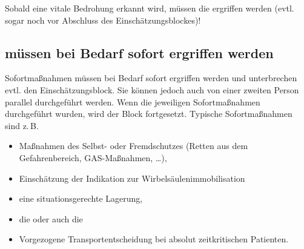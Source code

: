 \begin{Danger}
  \item Sobald eine vitale Bedrohung erkannt wird, müssen die
  \TxMassVit{}
  ergriffen werden (evtl. sogar noch vor Abschluss des
  Einschätzungsblockes)!
\end{Danger}



\subsection{ müssen bei Bedarf sofort ergriffen werden}
\label{topic:patientenmanagement-erstmassnahmen-apam}
\label{topic:patientenmanagement-sofortmassnahmen-apam}


Sofortmaßnahmen müssen bei Bedarf sofort ergriffen
werden und unterbrechen evtl. den Einschätzungsblock. Sie
können jedoch auch von einer zweiten Person parallel
durchgeführt werden. Wenn die jeweiligen Sofortmaßnahmen durchgeführt
wurden, wird der Block fortgesetzt. Typische Sofortmaßnahmen
sind z.\,B. 
\begin{itemize}
  \item Maßnahmen des Selbst- oder Fremdschutzes (Retten
  aus dem Gefahrenbereich, GAS-Maßnahmen, \ldots),
  \item Einschätzung der Indikation zur Wirbelsäulenimmobilisation
  \item eine situationsgerechte Lagerung,
  \item die \EE{\TxMassVit} oder auch die
  \item Vorgezogene Transportentscheidung bei absolut zeitkritischen Patienten.
\end{itemize}

\clearpage %




